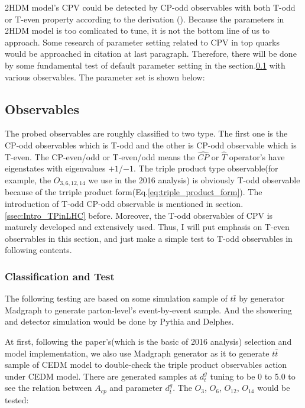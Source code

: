 			2HDM model's CPV could be detected by CP-odd observables with both T-odd or T-even property according to the derivation (\cite{Bernreuther:1993hq}). Because the parameters in 2HDM model is too comlicated to tune, it is not the bottom line of us to approach. Some research of parameter setting related to CPV in top quarks would be approached in citation at last paragraph. Therefore, there will be done by some fundamental test of default parameter setting in the section.\ref{ssec:AcpObs} with various observables. The parameter set is shown below:

	\subsection{Observables}
	\label{ssec:AcpObs}

		The probed observables are roughly classified to two type. The first one is the CP-odd observables which is T-odd and the other is CP-odd observable which is T-even. The CP-even/odd or T-even/odd means the $\hat{CP}$ or $\hat{T}$ operator's have eigenstates with eigenvalues $+1$/$-1$. The triple product type observable(for example, the $O_{3,6,12,14}$ we use in the 2016 analysis) is obviously T-odd observable because of the trriple product form(Eq.\ref{eq:triple_product_form}). The introduction of T-odd CP-odd observable is mentioned in section.\ref{ssec:Intro_TPinLHC} before. Moreover, the T-odd observables of CPV is maturely developed and extensively used. Thus, I will put emphasis on T-even observables in this section, and just make a simple test to T-odd observables in following contents.

		\subsubsection{Classification and Test}
		\label{sssec:AcpObs_class_test}

			The following testing are based on some simulation sample of $t\bar{t}$ by generator Madgraph to generate parton-level's event-by-event sample. And the showering and detector simulation would be done by Pythia\cite{Sjostrand:2014zea} and Delphes\cite{Ovyn:2009tx}.

			At first, following the paper\cite{Hayreter:2015ryk}'s(which is the basic of 2016 analysis) selection and model implementation, we also use Madgraph\cite{Alwall:2011uj} generator as it to generate $t\bar{t}$ sample of CEDM model to double-check the triple product observables action under CEDM model. There are generated samples at $d_t^g$ tuning to be 0 to 5.0 to see the relation between $A_{cp}$ and parameter $d_t^g$. The $O_{3}$, $O_{6}$, $O_{12}$, $O_{14}$ would be tested:

